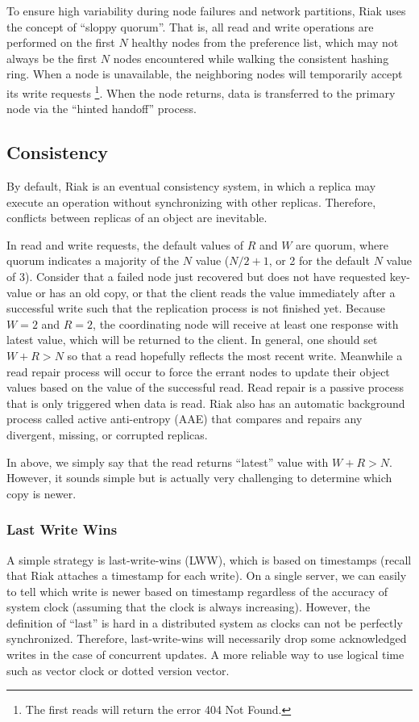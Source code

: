 \documentclass[11pt]{book}
\begin{document}
To ensure high variability during node failures and network partitions, Riak uses the concept of ``sloppy quorum''. That is, all read and write operations are performed on the first $N$ healthy nodes from the preference list, which may not always be the first $N$ nodes encountered while walking the consistent hashing ring.
When a node is unavailable, the neighboring nodes will temporarily accept its write requests \footnote{The first reads will return the error 404 Not Found.}. When the node returns, data is transferred to the primary node via the ``hinted handoff'' process.

\subsection{Consistency}
By default, Riak is an eventual consistency system, in which a replica may execute an operation without synchronizing with other replicas. Therefore, conflicts between replicas of an object are inevitable.

In read and write requests, the default values of $R$ and $W$ are quorum, where quorum indicates a majority of the $N$ value ($N/2+1$, or 2 for the default $N$ value of 3). Consider that a failed node just recovered but does not have requested key-value or has an old copy, or that the client reads the value immediately after a successful write such that the replication process is not finished yet. Because $W=2$ and $R=2$, the coordinating node will receive at least one response with latest value, which will be returned to the client. In general, one should set $W+R>N$ so that a read hopefully reflects the most recent write.
Meanwhile a read repair process will occur to force the errant nodes to update their object values based on the value of the successful read. 
Read repair is a passive process that is only triggered when data is read. Riak also has an automatic background process called active anti-entropy (AAE) that compares and repairs any divergent, missing, or corrupted replicas.

In above, we simply say that the read returns ``latest'' value with $W+R>N$. However, it sounds simple but is actually very challenging to determine which copy is newer.

\subsubsection{Last Write Wins}
A simple strategy is last-write-wins (LWW), which is based on timestamps (recall that Riak attaches a timestamp for each write). On a single server, we can easily to tell which write is newer based on timestamp regardless of the accuracy of system clock (assuming that the clock is always increasing). However, the definition of ``last'' is hard in a distributed system as clocks can not be perfectly synchronized.
Therefore, last-write-wins will necessarily drop some acknowledged writes in the case of concurrent updates. A more reliable way to use logical time such as vector clock or dotted version vector.
\end{document}
